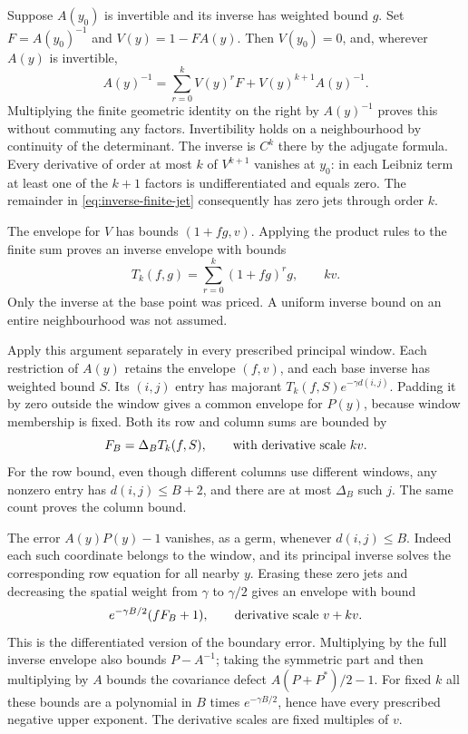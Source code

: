 Suppose $A(y_0)$ is invertible and its inverse has weighted bound
$g$. Set $F=A(y_0)^{-1}$ and $V(y)=1-FA(y)$. Then $V(y_0)=0$,
and, wherever $A(y)$ is invertible,
\begin{equation}\label{eq:inverse-finite-jet}
 A(y)^{-1}=\sum_{r=0}^k V(y)^rF+V(y)^{k+1}A(y)^{-1}.
\end{equation}
Multiplying the finite geometric identity on the right by $A(y)^{-1}$
proves this without commuting any factors. Invertibility holds on a
neighbourhood by continuity of the determinant. The inverse is $C^k$
there by the adjugate formula. Every derivative of order at most $k$
of $V^{k+1}$ vanishes at $y_0$: in each Leibniz term at least one of
the $k+1$ factors is undifferentiated and equals zero. The remainder
in \eqref{eq:inverse-finite-jet} consequently has zero jets through
order $k$.

The envelope for $V$ has bounds $(1+fg,v)$. Applying the product
rules to the finite sum proves an inverse envelope with bounds
\begin{equation}\label{eq:inverse-jet-price}
 T_k(f,g)=\sum_{r=0}^k(1+fg)^r g,\qquad kv.
\end{equation}
Only the inverse at the base point was priced. A uniform inverse
bound on an entire neighbourhood was not assumed.

Apply this argument separately in every prescribed principal window.
Each restriction of $A(y)$ retains the envelope $(f,v)$, and each
base inverse has weighted bound $S$. Its $(i,j)$ entry has majorant
$T_k(f,S)e^{-\gamma d(i,j)}$. Padding it by zero outside the window
gives a common envelope for $P(y)$, because window membership is fixed.
Both its row and column sums are bounded by
\begin{equation}\label{eq:pad-jet-price}
 F_B=\Delta_B T_k(f,S),\qquad\hbox{with derivative scale }kv.
\end{equation}
For the row bound, even though different columns use different
windows, any nonzero entry has $d(i,j)\le B+2$, and there are at
most $\Delta_B$ such $j$. The same count proves the column bound.

The error $A(y)P(y)-1$ vanishes, as a germ, whenever $d(i,j)\le B$.
Indeed each such coordinate belongs to the window, and its principal
inverse solves the corresponding row equation for all nearby $y$.
Erasing these zero jets and decreasing the spatial weight from
$\gamma$ to $\gamma/2$ gives an envelope with bound
\begin{equation}\label{eq:inverse-error-jets}
 e^{-\gamma B/2}(fF_B+1),\qquad
 \hbox{derivative scale }v+kv.
\end{equation}
This is the differentiated version of the boundary error. Multiplying
by the full inverse envelope also bounds $P-A^{-1}$; taking the
symmetric part and then multiplying by $A$ bounds the covariance
defect $A(P+P^*)/2-1$. For fixed $k$ all these bounds are a polynomial
in $B$ times $e^{-\gamma B/2}$, hence have every prescribed negative
upper exponent. The derivative scales are fixed multiples of $v$.


